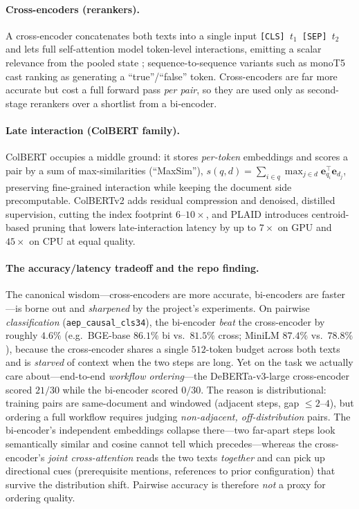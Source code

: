 \paragraph{Cross-encoders (rerankers).}
A cross-encoder concatenates both texts into a single input
\texttt{[CLS]\,$t_1$\,[SEP]\,$t_2$} and lets full self-attention model token-level
interactions, emitting a scalar relevance from the pooled state
\citep{emb:nogueira2019passage}; sequence-to-sequence variants such as monoT5
\citep{emb:nogueira2020monot5} cast ranking as generating a ``true''/``false'' token.
Cross-encoders are far more accurate but cost a full forward pass \emph{per pair},
so they are used only as second-stage rerankers over a shortlist from a bi-encoder.

\paragraph{Late interaction (ColBERT family).}
ColBERT \citep{emb:khattab2020colbert} occupies a middle ground: it stores
\emph{per-token} embeddings and scores a pair by a sum of max-similarities
(``MaxSim''), $s(q,d)=\sum_{i\in q}\max_{j\in d}\mathbf{e}_{q_i}^{\!\top}\mathbf{e}_{d_j}$,
preserving fine-grained interaction while keeping the document side precomputable.
ColBERTv2 \citep{emb:santhanam2022colbertv2} adds residual compression and
denoised, distilled supervision, cutting the index footprint $6$--$10\times$, and
PLAID \citep{emb:santhanam2022plaid} introduces centroid-based pruning that lowers
late-interaction latency by up to $7\times$ on GPU and $45\times$ on CPU at equal
quality.

\paragraph{The accuracy/latency tradeoff and the repo finding.}
The canonical wisdom---cross-encoders are more accurate, bi-encoders are faster---is
borne out and \emph{sharpened} by the project's experiments. On pairwise
\emph{classification} (\texttt{aep\_causal\_cls34}), the bi-encoder \emph{beat} the
cross-encoder by roughly $4.6\%$ (e.g.\ BGE-base $86.1\%$ bi vs.\ $81.5\%$ cross;
MiniLM $87.4\%$ vs.\ $78.8\%$), because the cross-encoder shares a single $512$-token
budget across both texts and is \emph{starved} of context when the two steps are long.
Yet on the task we actually care about---end-to-end \emph{workflow ordering}---the
DeBERTa-v3-large cross-encoder scored $21/30$ while the bi-encoder scored $0/30$. The
reason is distributional: training pairs are same-document and windowed (adjacent
steps, gap $\le 2$--$4$), but ordering a full workflow requires judging
\emph{non-adjacent, off-distribution} pairs. The bi-encoder's independent embeddings
collapse there---two far-apart steps look semantically similar and cosine cannot tell
which precedes---whereas the cross-encoder's \emph{joint cross-attention} reads the two
texts \emph{together} and can pick up directional cues (prerequisite mentions,
references to prior configuration) that survive the distribution shift. Pairwise
accuracy is therefore \emph{not} a proxy for ordering quality.

